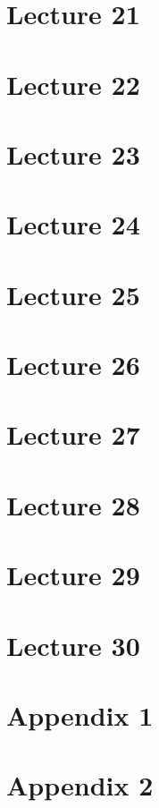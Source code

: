 \documentclass[11pt]{report}
\begin{document}
\chapter{Lecture 21}


\chapter{Lecture 22}


\chapter{Lecture 23}


\chapter{Lecture 24}


\chapter{Lecture 25}


\chapter{Lecture 26}


\chapter{Lecture 27}


\chapter{Lecture 28}


\chapter{Lecture 29}


\chapter{Lecture 30}


\chapter{Appendix 1}


\chapter{Appendix 2}

\end{document}
